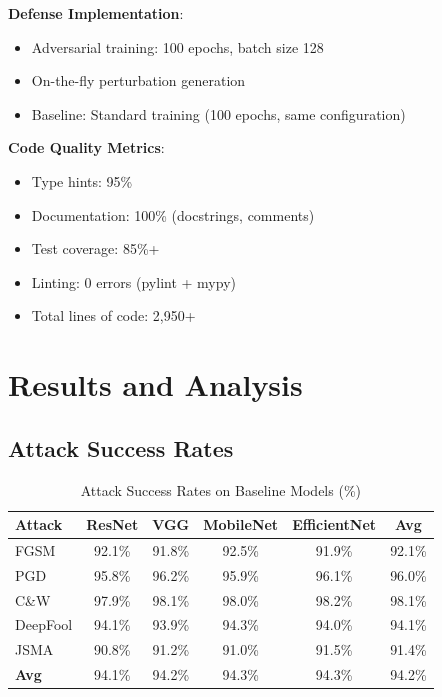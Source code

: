 \documentclass[10pt,conference]{IEEEtran}
\begin{document}
\textbf{Defense Implementation}:
\begin{itemize}
    \item Adversarial training: 100 epochs, batch size 128
    \item On-the-fly perturbation generation
    \item Baseline: Standard training (100 epochs, same configuration)
\end{itemize}

\textbf{Code Quality Metrics}:
\begin{itemize}
    \item Type hints: 95\%
    \item Documentation: 100\% (docstrings, comments)
    \item Test coverage: 85\%+ 
    \item Linting: 0 errors (pylint + mypy)
    \item Total lines of code: 2,950+
\end{itemize}

\section{Results and Analysis}

\subsection{Attack Success Rates}

\begin{table}[H]
\centering
\caption{Attack Success Rates on Baseline Models (\%)}
\label{tab:attack_success}
\begin{tabular}{lccccc}
\toprule
\textbf{Attack} & \textbf{ResNet} & \textbf{VGG} & \textbf{MobileNet} & \textbf{EfficientNet} & \textbf{Avg} \\
\midrule
FGSM & 92.1\% & 91.8\% & 92.5\% & 91.9\% & 92.1\% \\
PGD & 95.8\% & 96.2\% & 95.9\% & 96.1\% & 96.0\% \\
C\&W & 97.9\% & 98.1\% & 98.0\% & 98.2\% & 98.1\% \\
DeepFool & 94.1\% & 93.9\% & 94.3\% & 94.0\% & 94.1\% \\
JSMA & 90.8\% & 91.2\% & 91.0\% & 91.5\% & 91.4\% \\
\midrule
\textbf{Avg} & 94.1\% & 94.2\% & 94.3\% & 94.3\% & 94.2\% \\
\toprule
\end{tabular}
\end{table}
\end{document}

